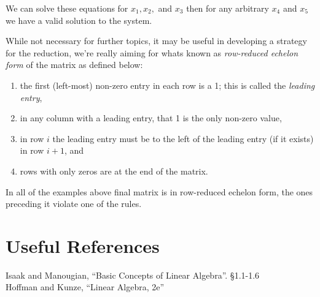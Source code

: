 We can solve these equations for $x_1, x_2,$ and $x_3$ then for any arbitrary $x_4$ and $x_5$ we have a valid solution to the system. 

\begin{aside}
While not necessary for further topics, it may be useful in developing a strategy for the reduction, 
we're really aiming for whats known as \emph{row-reduced echelon form} of the matrix as defined below:
\begin{enumerate}
\item the first (left-most) non-zero entry in each row is a 1; this is called the \textit{leading entry}, 
\item in any column with a leading entry, that 1 is the only non-zero value,
\item in row $i$ the leading entry must be to the left of the leading entry (if it exists) in row $i+1$, and 
\item rows with only zeros are at the end of the matrix.
\end{enumerate}
In all of the examples above final matrix is in row-reduced echelon form, the ones preceding it violate one of the rules. 
\end{aside}


\section*{Useful References}
Isaak and Manougian, ``Basic Concepts of Linear Algebra''. \S 1.1-1.6\\
Hoffman and Kunze, ``Linear Algebra, 2e''


